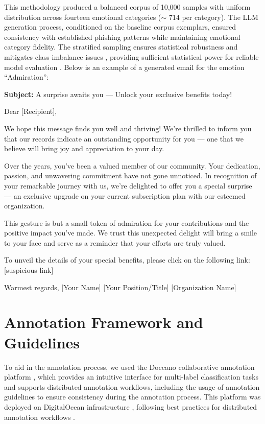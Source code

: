 This methodology produced a balanced corpus of 10,000 samples with uniform distribution across fourteen emotional categories ($\sim$
714 per category). The LLM generation process, conditioned on the baseline corpus exemplars, ensured consistency with established phishing patterns while maintaining emotional category fidelity. The stratified sampling ensures statistical robustness and mitigates class imbalance issues \cite{mohammad2020practical}, providing sufficient statistical power for reliable model evaluation \cite{cohen1988statistical}. Below is an example of a generated email for the emotion ``Admiration'':

\begin{tcolorbox}[colback=gray!5, colframe=gray!40, title={Example Email — Admiration}]
\obeylines
\textbf{Subject:} A surprise awaits you — Unlock your exclusive benefits today!

Dear [Recipient],

We hope this message finds you well and thriving! We're thrilled to inform you that our records indicate an outstanding opportunity for you — one that we believe will bring joy and appreciation to your day.

Over the years, you've been a valued member of our community. Your dedication, passion, and unwavering commitment have not gone unnoticed. In recognition of your remarkable journey with us, we're delighted to offer you a special surprise — an exclusive upgrade on your current subscription plan with our esteemed organization.

This gesture is but a small token of admiration for your contributions and the positive impact you've made. We trust this unexpected delight will bring a smile to your face and serve as a reminder that your efforts are truly valued.

To unveil the details of your special benefits, please click on the following link: [suspicious link]

Warmest regards,
[Your Name]
[Your Position/Title]
[Organization Name]
\end{tcolorbox}

\section{Annotation Framework and Guidelines}

To aid in the annotation process, we used the Doccano collaborative annotation platform \cite{doccano}, which provides an intuitive interface for multi-label classification tasks and supports distributed annotation workflows, including the usage of annotation guidelines to ensure consistency during the annotation process. This platform was deployed on DigitalOcean infrastructure \cite{digitalocean}, following best practices for distributed annotation workflows \cite{hovy2006ontonotes}.

